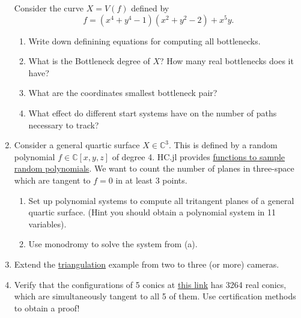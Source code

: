 \documentclass[11pt,reqno]{amsart}
\theoremstyle{definition}
\theoremstyle{remark}
\numberwithin{equation}{section}
\begin{document}
\begin{enumerate}
Consider the curve $X=V(f)$ defined by 
$$f=(x^4 + y^4 - 1)(x^2 + y^2 - 2) + x^5y.$$
\begin{enumerate}
\item Write down definining equations for computing all bottlenecks.

\item What is the Bottleneck degree of $X$? How many real bottlenecks does it have?

\item What are the coordinates smallest bottleneck pair?

\item What effect do different start systems have on the number of paths necessary to track?
\end{enumerate}

\item Consider a general quartic surface $X\in\mathbb C^3$.  This is defined by a random polynomial $f\in \mathbb{C}[x,y,z]$ of degree 4. HC.jl provides  \href{https://www.juliahomotopycontinuation.org/HomotopyContinuation.jl/stable/model_kit/}{functions to sample random polynomials}. We want to count the number of planes in three-space which are tangent to $f=0$ in at least 3 points.
\begin{enumerate}
\item Set up polynomial systems to compute all tritangent planes of a general quartic surface. (Hint you should obtain a polynomial system in 11 variables).
\item Use monodromy to solve the system from (a).
\end{enumerate}

\item Extend the \href{https://www.juliahomotopycontinuation.org/examples/computer-vision/}{triangulation} example from two to three (or more) cameras.

\item Verify that the configurations of 5 conics at \href{https://www.juliahomotopycontinuation.org/examples/3264/}{this link} has 3264 real conics, which are simultaneously tangent to all 5 of them. Use certification methods to obtain a proof! 
\end{enumerate}
\end{document}
